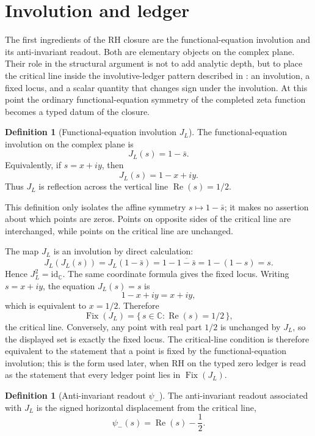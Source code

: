 \documentclass[11pt]{article}
\DeclareMathOperator{\Fix}{Fix}
\DeclareMathOperator{\Real}{Re}
\newcommand{\JL}{J_{L}}
\newcommand{\psimRH}{\psi_{-}}
\theoremstyle{definition}
\newtheorem{definition}[theorem]{Definition}
\begin{document}
\section{Involution and ledger}
\label{sec:involution_and_ledger}

The first ingredients of the RH closure are the
functional-equation involution and its anti-invariant readout.  Both
are elementary objects on the complex plane.  Their role in the
structural argument is not to add analytic depth, but to place the
critical line inside the involutive-ledger pattern described in
: an involution, a fixed locus, and a scalar
quantity that changes sign under the involution.  At this point the
ordinary functional-equation symmetry of the completed zeta function
becomes a typed datum of the closure.

\begin{definition}[Functional-equation involution \(\JL\)]
\label{def:rh:fe-involution}
The functional-equation involution on the complex plane is
\[
  \JL(s) = 1-\bar{s}.
\]
Equivalently, if \(s=x+iy\), then
\[
  \JL(s) = 1-x+iy.
\]
Thus \(\JL\) is reflection across the vertical line
\(\Real(s)=1/2\).
\end{definition}

This definition only isolates the affine symmetry \(s\mapsto
1-\bar{s}\); it makes no assertion about which points are zeros.
Points on opposite sides of the critical line are interchanged, while
points on the critical line are unchanged.

The map \(\JL\) is an involution by direct calculation:
\[
  \JL(\JL(s))
    = \JL(1-\bar{s})
    = 1-\overline{1-\bar{s}}
    = 1-(1-s)
    = s.
\]
Hence \(\JL^{2}=\mathrm{id}_{\mathbb{C}}\).  The same coordinate formula gives
the fixed locus.  Writing \(s=x+iy\), the equation \(\JL(s)=s\) is
\[
  1-x+iy = x+iy,
\]
which is equivalent to \(x=1/2\).  Therefore
\[
  \Fix(\JL)
    =
  \{\,s\in\mathbb{C} : \Real(s)=1/2\,\},
\]
the critical line.  Conversely, any point with real part \(1/2\) is unchanged by
\(\JL\), so the displayed set is exactly the fixed locus.  The
critical-line condition is therefore equivalent to the statement
that a point is fixed by the functional-equation involution; this
is the form used later, when RH on the typed zero ledger is read as
the statement that every ledger point lies in \(\Fix(\JL)\).

\begin{definition}[Anti-invariant readout \(\psimRH\)]
\label{def:rh:psi-minus-rh}
The anti-invariant readout associated with \(\JL\) is the signed
horizontal displacement from the critical line,
\[
  \psimRH(s)=\Real(s)-\frac{1}{2}.
\]
\end{definition}
\end{document}
